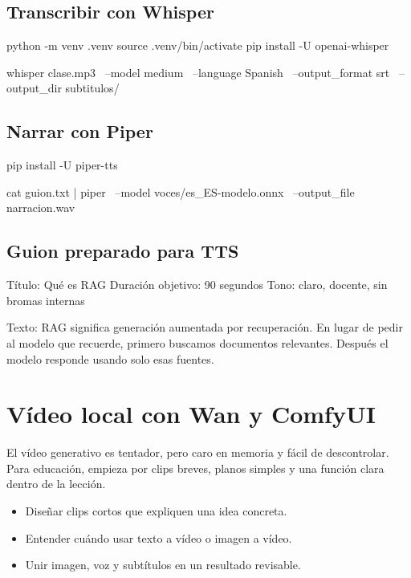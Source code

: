 \documentclass[11pt,a4paper]{book}
\begin{document}
\section{Transcribir con Whisper}
\begin{codebox}
python -m venv .venv
source .venv/bin/activate
pip install -U openai-whisper

whisper clase.mp3 \
  --model medium \
  --language Spanish \
  --output_format srt \
  --output_dir subtitulos/
\end{codebox}
\section{Narrar con Piper}
\begin{codebox}
pip install -U piper-tts

cat guion.txt | piper \
  --model voces/es_ES-modelo.onnx \
  --output_file narracion.wav
\end{codebox}
\section{Guion preparado para TTS}
\begin{codebox}
Título: Qué es RAG
Duración objetivo: 90 segundos
Tono: claro, docente, sin bromas internas

Texto:
RAG significa generación aumentada por recuperación.
En lugar de pedir al modelo que recuerde, primero buscamos documentos relevantes.
Después el modelo responde usando solo esas fuentes.
\end{codebox}
\chapter{Vídeo local con Wan y ComfyUI}
El vídeo generativo es tentador, pero caro en memoria y fácil de descontrolar. Para educación, empieza por clips breves, planos simples y una función clara dentro de la lección.

\begin{itemize}\item Diseñar clips cortos que expliquen una idea concreta.\end{itemize}
\begin{itemize}\item Entender cuándo usar texto a vídeo o imagen a vídeo.\end{itemize}
\begin{itemize}\item Unir imagen, voz y subtítulos en un resultado revisable.\end{itemize}
\end{document}
